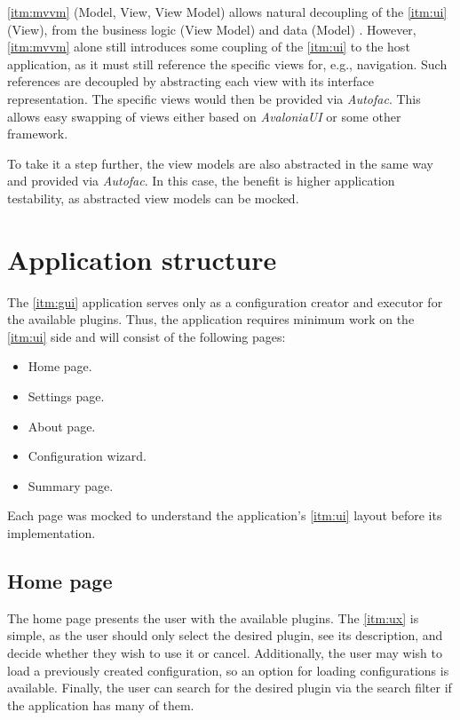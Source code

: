 \ref{itm:mvvm} (Model, View, View Model) allows natural decoupling of the \ref{itm:ui} (View), from the business logic (View Model) and data (Model) \cite{katz_mvvm_2022}. However, \ref{itm:mvvm} alone still introduces some coupling of the \ref{itm:ui} to the host application, as it must still reference the specific views for, e.g., navigation. Such references are decoupled by abstracting each view with its interface representation. The specific views would then be provided via \textit{Autofac}. This allows easy swapping of views either based on \textit{AvaloniaUI} or some other framework.

To take it a step further, the view models are also abstracted in the same way and provided via \textit{Autofac}. In this case, the benefit is higher application testability, as abstracted view models can be mocked.

\section{Application structure}

The \ref{itm:gui} application serves only as a configuration creator and executor for the available plugins.
Thus, the application requires minimum work on the \ref{itm:ui} side and will consist of the following pages:
\begin{itemize}
    \item Home page.
    \item Settings page.
    \item About page.
    \item Configuration wizard.
    \item Summary page.
\end{itemize}

Each page was mocked to understand the application's \ref{itm:ui} layout before its implementation.

\subsection{Home page}

The home page presents the user with the available plugins. The \ref{itm:ux} is simple, as the user should only select the desired plugin, see its description, and decide whether they wish to use it or cancel.
Additionally, the user may wish to load a previously created configuration, so an option for loading configurations is available.
Finally, the user can search for the desired plugin via the search filter if the application has many of them.

